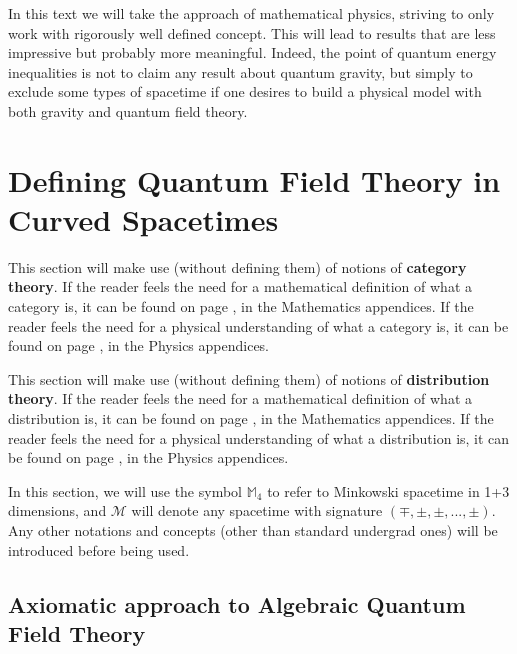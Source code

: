 \documentclass[a4paper,11pt]{article}
\numberwithin{equation}{section}
\theoremstyle{definition}
\begin{document}
In this \color{red} text \color{black} we will take the approach of mathematical physics, striving to only work with rigorously well defined concept. This will lead to results that are less impressive but probably more meaningful. Indeed, the point of quantum energy inequalities is not to claim any result about quantum gravity, but simply to exclude some types of spacetime if one desires to build a physical model with both gravity and quantum field theory. 
\newpage
\tableofcontents
\newpage
\section{Defining Quantum Field Theory in Curved Spacetimes}
This section will make use (without defining them) of notions of \textbf{category theory}. If the reader feels the need for a mathematical definition of what a category is, it can be found on page \pageref{AnMaCat}, in the Mathematics appendices. If the reader feels the need for a physical understanding of what a category is, it can be found on page \pageref{AnPhCat}, in the Physics appendices.

This section will make use (without defining them) of notions of \textbf{distribution theory}. If the reader feels the need for a mathematical definition of what a distribution is, it can be found on page \pageref{DistribMath}, in the Mathematics appendices. If the reader feels the need for a physical understanding of what a distribution is, it can be found on page \pageref{DistribPhy}, in the Physics appendices.

In this section, we will use the symbol $\mathbb{M}_4$ to refer to Minkowski spacetime in 1+3 dimensions, and $\mathcal{M}$ will denote any spacetime with signature $(\mp, \pm,\pm, ..., \pm)$. Any other notations and concepts (other than standard undergrad ones) will be introduced before being used.

\subsection{Axiomatic approach to Algebraic Quantum Field Theory}
\end{document}
